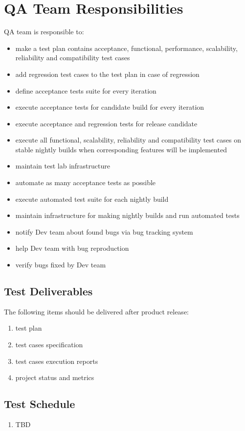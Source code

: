 \documentclass[a4paper,11pt]{article}
\begin{document}
\section{QA Team Responsibilities}
QA team is responsible to:
\begin{itemize}
\item make a test plan contains acceptance, functional, performance, scalability, reliability and compatibility test cases
\item add regression test cases to the test plan in case of regression
\item define acceptance tests suite for every iteration
\item execute acceptance tests for candidate build for every iteration
\item execute acceptance and regression tests for release candidate
\item execute all functional, scalability, reliability and compatibility test cases on stable nightly builds when corresponding features will be implemented
\item maintain test lab infrastructure
\item automate as many acceptance tests as possible
\item execute automated test suite for each nightly build
\item maintain infrastructure for making nightly builds and run automated tests
\item notify Dev team about found bugs via bug tracking system
\item help Dev team with bug reproduction
\item verify bugs fixed by Dev team
\end{itemize}

\subsection{Test Deliverables}
The following items should be delivered after product release:
\begin{enumerate}
\item test plan
\item test cases specification
\item test cases execution reports
\item project status and metrics
\end{enumerate}


\subsection{Test Schedule}
\begin{enumerate}
\item TBD
\end{enumerate}
\end{document}
